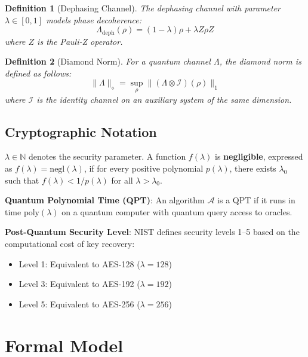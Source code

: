 \documentclass{ieeeaccess}
\newtheorem{definition}{Definition}[section]
\begin{document}
\begin{definition}[Dephasing Channel]
The dephasing channel with parameter $\lambda \in [0, 1]$ models phase decoherence:
\begin{equation}
    \Lambda_{\text{deph}}(\rho) = (1-\lambda)\rho + \lambda Z \rho Z
\end{equation}
where $Z$ is the Pauli-Z operator.
\end{definition}

\begin{definition}[Diamond Norm]
For a quantum channel $\Lambda$, the diamond norm is defined as follows:
\begin{equation}
    \|\Lambda\|_\diamond = \sup_{\rho} \|(\Lambda \otimes \mathcal{I})(\rho)\|_1
\end{equation}
where $\mathcal{I}$ is the identity channel on an auxiliary system of the same dimension.
\end{definition}

\subsection{Cryptographic Notation}

$\lambda \in \mathbb{N}$ denotes the security parameter. A function $f(\lambda)$ is \textbf{negligible}, expressed as $f(\lambda) = \text{negl}(\lambda)$, if for every positive polynomial $p(\lambda)$, there exists $\lambda_0$ such that $f(\lambda) < 1/p(\lambda)$ for all $\lambda > \lambda_0$.

\textbf{Quantum Polynomial Time (QPT)}: An algorithm $\mathcal{A}$ is a QPT if it runs in time $\text{poly}(\lambda)$ on a quantum computer with quantum query access to oracles.

\textbf{Post-Quantum Security Level}: NIST defines security levels 1--5 based on the computational cost of key recovery:
\begin{itemize}
    \item Level 1: Equivalent to AES-128 ($\lambda = 128$)
    \item Level 3: Equivalent to AES-192 ($\lambda = 192$)
    \item Level 5: Equivalent to AES-256 ($\lambda = 256$)
\end{itemize}


\section{Formal Model}\label{sec:model}
\end{document}
